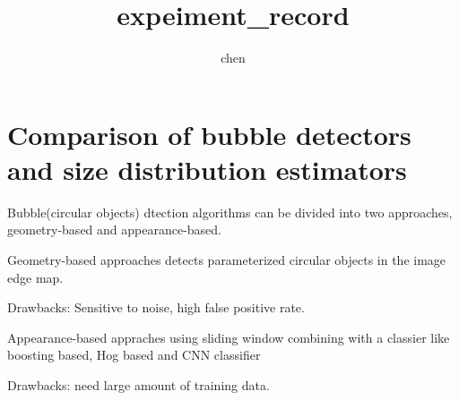 \documentclass{article}
\title{expeiment\_record}
\author{chen}
\begin{document}
\setlength{\parindent}{2em}
    \section{Comparison of bubble detectors and size distribution estimators}    
        Bubble(circular objects) dtection algorithms can be divided into two approaches, geometry-based and appearance-based.

        Geometry-based approaches detects parameterized circular objects in the image edge map.

        Drawbacks: Sensitive to noise, high false positive rate. 

        Appearance-based appraches using sliding window combining with a classier like boosting based, 
        Hog based and CNN classifier

        Drawbacks: need large amount of training data.
\end{document}
